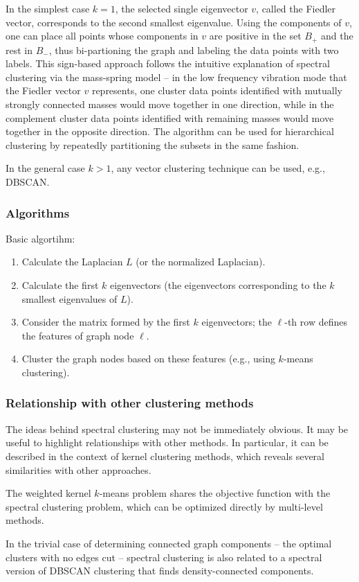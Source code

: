 In the simplest case \(k = 1\), the selected single eigenvector \(v\), called the Fiedler vector, corresponds to the second smallest eigenvalue.
Using the components of \(v\), one can place all points whose components in \(v\) are positive in the set \(B_+\) and the rest in \(B_-\), thus bi-partioning the graph and labeling the data points with two labels.
This sign-based approach follows the intuitive explanation of spectral clustering via the mass-spring model -- in the low frequency vibration mode that the Fiedler vector \(v\) represents, one cluster data points identified with mutually strongly connected masses would move together in one direction, while in the complement cluster data points identified with remaining masses would move together in the opposite direction.
The algorithm can be used for hierarchical clustering by repeatedly partitioning the subsets in the same fashion.

In the general case \(k > 1\), any vector clustering technique can be used, e.g., DBSCAN.

\subsubsection{Algorithms}

Basic algortihm:
\begin{enumerate}
	\item Calculate the Laplacian \(L\) (or the normalized Laplacian).
	\item Calculate the first \(k\) eigenvectors (the eigenvectors corresponding to the \(k\) smallest eigenvalues of \(L\)).
	\item Consider the matrix formed by the first \(k\) eigenvectors; the \(\ell\)-th row defines the features of graph node \(\ell\).
	\item Cluster the graph nodes based on these features (e.g., using \(k\)-means clustering).
\end{enumerate}


\subsubsection{Relationship with other clustering methods}

The ideas behind spectral clustering may not be immediately obvious.
It may be useful to highlight relationships with other methods.
In particular, it can be described in the context of kernel clustering methods, which reveals several similarities with other approaches.

The weighted kernel \(k\)-means problem shares the objective function with the spectral clustering problem, which can be optimized directly by multi-level methods.

In the trivial case of determining connected graph components -- the optimal clusters with no edges cut -- spectral clustering is also related to a spectral version of DBSCAN clustering that finds density-connected components.
